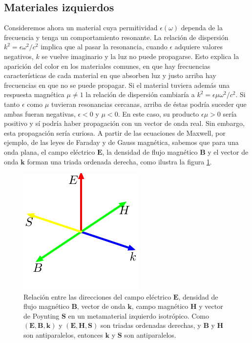 \documentclass[12pt]{article}
\begin{document}
\subsection{Materiales izquierdos}
Consideremos ahora un material cuya permitividad $\epsilon(\omega)$
dependa de la frecuencia y tenga un comportamiento resonante. La
relación de dispersión $k^2=\epsilon\omega^2/c^2$ implica que al pasar
la resonancia, cuando $\epsilon$ adquiere valores negativos, $k$ se
vuelve imaginario y la luz no puede propagarse. Esto explica la
aparición del color en los materiales comunes, en que hay frecuencias
características de cada material en que absorben luz y justo arriba
hay frecuencias en que no se puede propagar. Si el material tuviera
además una respuesta magnética $\mu\ne 1$ la relación de dispersión
cambiaría a $k^2=\epsilon\mu\omega^2/c^2$. Si tanto $\epsilon$ como
$\mu$ tuvieran resonancias cercanas, arriba de éstas podría suceder
que ambas fueran negativas, $\epsilon<0$ y $\mu<0$. En este caso, su
producto $\epsilon\mu>0$ sería positivo y sí podría haber propagación
con un vector de onda real. Sin embargo, esta propagación sería
curiosa. A partir de las ecuaciones de Maxwell, por ejemplo,
de las leyes de Faraday y de Gauss magnética, sabemos que para una onda plana,
el campo eléctrico $\bm E$, la densidad de flujo magnético $\bm B$ y
el vector de onda $\bm k$ forman una triada ordenada derecha, como
ilustra la figura \ref{fig:triada}.
\begin{figure}
  \centering
  \includegraphics{fig8}
  \caption{Relación entre las direcciones del campo eléctrico $\bm E$,
    densidad de flujo magnético $\bm B$, vector de onda $\bm k$, campo
    magnético $\bm H$ y vector de Poynting $\bm S$ en un metamaterial
    izquierdo isotrópico. Como $(\bm E, \bm B, \bm k)$ y
    $(\bm E, \bm H,\bm S)$ son triadas ordenadas derechas, y $\bm B$ y
    $\bm H$ son antiparalelos, entonces $\bm k$ y $\bm S$ son
    antiparalelos.  }
  \label{fig:triada}
\end{figure}
\end{document}
